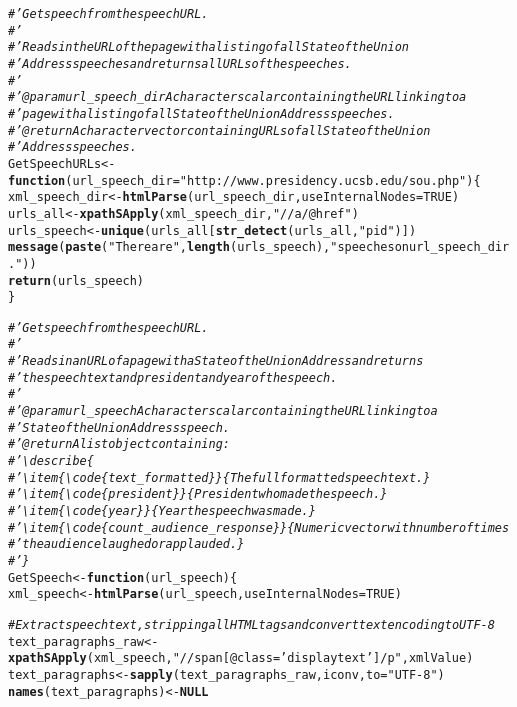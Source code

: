 \documentclass{article}\usepackage[]{graphicx}\usepackage[]{color}
\makeatletter
\newcommand{\hlnum}[1]{\textcolor[rgb]{0.686,0.059,0.569}{#1}}%
\newcommand{\hlstr}[1]{\textcolor[rgb]{0.192,0.494,0.8}{#1}}%
\newcommand{\hlcom}[1]{\textcolor[rgb]{0.678,0.584,0.686}{\textit{#1}}}%
\newcommand{\hlstd}[1]{\textcolor[rgb]{0.345,0.345,0.345}{#1}}%
\newcommand{\hlkwa}[1]{\textcolor[rgb]{0.161,0.373,0.58}{\textbf{#1}}}%
\newcommand{\hlkwb}[1]{\textcolor[rgb]{0.69,0.353,0.396}{#1}}%
\newcommand{\hlkwc}[1]{\textcolor[rgb]{0.333,0.667,0.333}{#1}}%
\newcommand{\hlkwd}[1]{\textcolor[rgb]{0.737,0.353,0.396}{\textbf{#1}}}%
\newenvironment{kframe}{%
 \def\at@end@of@kframe{}%
 \ifinner\ifhmode%
  \def\at@end@of@kframe{\end{minipage}}%
  \begin{minipage}{\columnwidth}%
 \fi\fi%
 \def\FrameCommand##1{\hskip\@totalleftmargin \hskip-\fboxsep
 \colorbox{shadecolor}{##1}\hskip-\fboxsep
     \hskip-\linewidth \hskip-\@totalleftmargin \hskip\columnwidth}%
 \MakeFramed {\advance\hsize-\width
   \@totalleftmargin\z@ \linewidth\hsize
   \@setminipage}}%
 {\par\unskip\endMakeFramed%
 \at@end@of@kframe}
\newenvironment{knitrout}{}{} %
\makeatother
\begin{document}
\begin{knitrout}
\begin{kframe}
\begin{alltt}
\hlcom{#' Get speech from the speech URL.}
\hlcom{#' }
\hlcom{#' Reads in the URL of the page with a listing of all State of the Union }
\hlcom{#' Address speeches and returns all URLs of the speeches.}
\hlcom{#' }
\hlcom{#' @param url_speech_dir A character scalar containing the URL linking to a}
\hlcom{#' page with a listing of all State of the Union Address speeches.}
\hlcom{#' @return A character vector containing URLs of all State of the Union }
\hlcom{#' Address speeches.}
\hlstd{GetSpeechURLs} \hlkwb{<-} \hlkwa{function}\hlstd{(}\hlkwc{url_speech_dir} \hlstd{=} \hlstr{"http://www.presidency.ucsb.edu/sou.php"}\hlstd{) \{}
  \hlstd{xml_speech_dir} \hlkwb{<-} \hlkwd{htmlParse}\hlstd{(url_speech_dir,} \hlkwc{useInternalNodes} \hlstd{=} \hlnum{TRUE}\hlstd{)}
  \hlstd{urls_all} \hlkwb{<-} \hlkwd{xpathSApply}\hlstd{(xml_speech_dir,} \hlstr{"//a/@href"}\hlstd{)}
  \hlstd{urls_speech} \hlkwb{<-} \hlkwd{unique}\hlstd{(urls_all[}\hlkwd{str_detect}\hlstd{(urls_all,} \hlstr{"pid"}\hlstd{)])}
  \hlkwd{message}\hlstd{(}\hlkwd{paste}\hlstd{(}\hlstr{"There are"}\hlstd{,} \hlkwd{length}\hlstd{(urls_speech),} \hlstr{"speeches on url_speech_dir."}\hlstd{))}
  \hlkwd{return}\hlstd{(urls_speech)}
\hlstd{\}}

\hlcom{#' Get speech from the speech URL.}
\hlcom{#' }
\hlcom{#' Reads in an URL of a page with a State of the Union Address and returns}
\hlcom{#' the speech text and president and year of the speech.}
\hlcom{#' }
\hlcom{#' @param url_speech A character scalar containing the URL linking to a}
\hlcom{#' State of the Union Address speech.}
\hlcom{#' @return A list object containing: }
\hlcom{#' \textbackslash{}describe\{}
\hlcom{#'   \textbackslash{}item\{\textbackslash{}code\{text_formatted\}\}\{The full formatted speech text.\}}
\hlcom{#'   \textbackslash{}item\{\textbackslash{}code\{president\}\}\{President who made the speech.\}}
\hlcom{#'   \textbackslash{}item\{\textbackslash{}code\{year\}\}\{Year the speech was made.\}}
\hlcom{#'   \textbackslash{}item\{\textbackslash{}code\{count_audience_response\}\}\{Numeric vector with number of times}
\hlcom{#'   the audience laughed or applauded.\}}
\hlcom{#' \}}
\hlstd{GetSpeech} \hlkwb{<-} \hlkwa{function}\hlstd{(}\hlkwc{url_speech}\hlstd{) \{}
  \hlstd{xml_speech} \hlkwb{<-} \hlkwd{htmlParse}\hlstd{(url_speech,} \hlkwc{useInternalNodes} \hlstd{=} \hlnum{TRUE}\hlstd{)}

  \hlcom{# Extract speech text, stripping all HTML tags and convert text encoding to UTF-8}
  \hlstd{text_paragraphs_raw} \hlkwb{<-} \hlkwd{xpathSApply}\hlstd{(xml_speech,} \hlstr{"//span[@class='displaytext']/p"}\hlstd{, xmlValue)}
  \hlstd{text_paragraphs} \hlkwb{<-} \hlkwd{sapply}\hlstd{(text_paragraphs_raw, iconv,} \hlkwc{to} \hlstd{=} \hlstr{"UTF-8"}\hlstd{)}
  \hlkwd{names}\hlstd{(text_paragraphs)} \hlkwb{<-} \hlkwa{NULL}


\end{alltt}
\end{kframe}
\end{knitrout}
\end{document}
